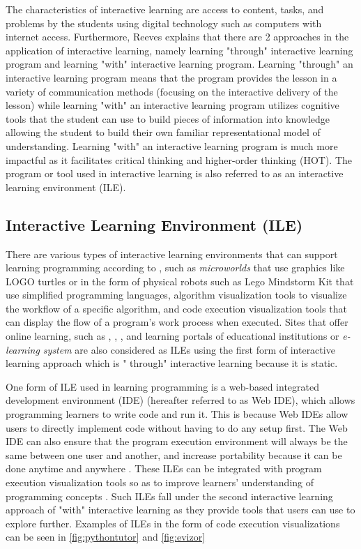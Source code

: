 \documentclass[conference]{IEEEtran}
\begin{document}
The characteristics of interactive learning \cite{reeves2012interactive} are access to content, tasks, and problems by the students using digital technology such as computers with internet access. Furthermore, Reeves \cite{reeves2012interactive} explains that there are 2 approaches in the application of interactive learning, namely learning "through" interactive learning program and learning "with" interactive learning program. Learning "through" an interactive learning program means that the program provides the lesson in a variety of communication methods (focusing on the interactive delivery of the lesson) while learning "with" an interactive learning program utilizes cognitive tools that the student can use to build pieces of information into knowledge allowing the student to build their own familiar representational model of understanding. Learning "with" an interactive learning program is much more impactful as it facilitates critical thinking and higher-order thinking (HOT). The program or tool used in interactive learning is also referred to as an interactive learning environment (ILE).

\subsection{Interactive Learning Environment (ILE)}
There are various types of interactive learning environments that can support learning programming according to \cite{moons2013pilot}, such as \textit{microworlds} that use graphics like LOGO turtles or in the form of physical robots such as Lego Mindstorm Kit that use simplified programming languages, algorithm visualization tools to visualize the workflow of a specific algorithm, and code execution visualization tools that can display the flow of a program's work process when executed. Sites that offer online learning, such as \cite{sololearn2021media}, \cite{codesaya2021media}, \cite{brilliant2021media}, and learning portals of educational institutions or \textit{e-learning system} are also considered as ILEs using the first form of interactive learning approach which is " through" interactive learning because it is static.

One form of ILE used in learning programming is a web-based integrated development environment (IDE) (hereafter referred to as Web IDE), which allows programming learners to write code and run it. This is because Web IDEs allow users to directly implement code without having to do any setup first. The Web IDE can also ensure that the program execution environment will always be the same between one user and another, and increase portability because it can be done anytime and anywhere \cite{tran2013interactive}. These ILEs can be integrated with program execution visualization tools so as to improve learners' understanding of programming concepts \cite{moons2013pilot}. Such ILEs fall under the second interactive learning approach of "with" interactive learning as they provide tools that users can use to explore further. Examples of ILEs in the form of code execution visualizations can be seen in \ref{fig:pythontutor} and \ref{fig:evizor}
\end{document}
